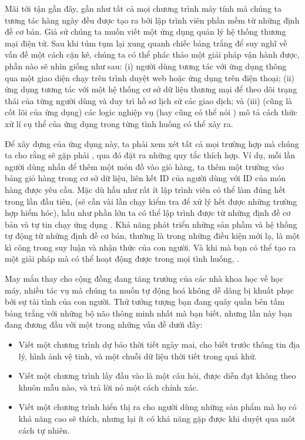 \documentclass[letterpaper,11pt,english]{sphinxmanual}
\begin{document}
Mãi tới tận gần đây, gần như tất cả mọi chương trình máy tính mà chúng
ta tương tác hàng ngày đều được tạo ra bởi lập trình viên phần mềm từ
những định đề cơ bản. Giả sử chúng ta muốn viết một ứng dụng quản lý hệ
thống thương mại điện tử. Sau khi túm tụm lại xung quanh chiếc bảng
trắng để suy nghĩ về vấn đề một cách cặn kẽ, chúng ta có thể phác thảo
một giải pháp vận hành được, phần nào sẽ nhìn giống như sau: (i) người
dùng tương tác với ứng dụng thông qua một giao diện chạy trên trình
duyệt web hoặc ứng dụng trên điện thoại; (ii) ứng dụng tương tác với một
hệ thống cơ sở dữ liệu thương mại để theo dõi trạng thái của từng người
dùng và duy trì hồ sơ lịch sử các giao dịch; và (iii) (cũng là cốt lõi
của ứng dụng) các logic nghiệp vụ (hay cũng có thể nói ) mô tả
cách thức xử lí cụ thể của ứng dụng trong từng tình huống có thể xảy ra.



Để xây dựng  của ứng dụng này, ta phải xem xét tất cả mọi trường
hợp mà chúng ta cho rằng sẽ gặp phải , qua đó đặt ra những quy tắc thích
hợp. Ví dụ, mỗi lần người dùng nhấn để thêm một món đồ vào giỏ hàng, ta
thêm một trường vào bảng giỏ hàng trong cơ sở dữ liệu, liên kết ID của
người dùng với ID của món hàng được yêu cầu. Mặc dù hầu như rất ít lập
trình viên có thể làm đúng hết trong lần đầu tiên, (sẽ cần vài lần chạy
kiểm tra để xử lý hết được những trường hợp hiểm hóc), hầu như phần lớn
ta có thể lập trình được từ những định đề cơ bản và tự tin chạy ứng dụng
. Khả năng phát
triển những sản phầm và hệ thống tự động từ những định đề cơ bản, thường
là trong những điều kiện mới lạ, là một kì công trong suy luận và nhận
thức của con người. Và khi mà bạn có thể tạo ra một giải pháp mà có thể
hoạt động được trong mọi tình huống, .



May mắn thay cho cộng đồng đang tăng trưởng của các nhà khoa học về học
máy, nhiều tác vụ mà chúng ta muốn tự động hoá không dễ dàng bị khuất
phục bởi sự tài tình của con người. Thử tưởng tượng bạn đang quây quần
bên tấm bảng trắng với những bộ não thông minh nhất mà bạn biết, nhưng
lần này bạn đang đương đầu với một trong những vấn đề dưới đây:


\begin{itemize}
\item {} 
Viết một chương trình dự báo thời tiết ngày mai, cho biết trước thông
tin địa lý, hình ảnh vệ tinh, và một chuỗi dữ liệu thời tiết trong
quá khứ.

\item {} 
Viết một chương trình lấy đầu vào là một câu hỏi, được diễn đạt không
theo khuôn mẫu nào, và trả lời nó một cách chính xác.

\item {} 
Viết một chương trình hiển thị ra cho người dùng những sản phẩm mà họ
có khả năng cao sẽ thích, nhưng lại ít có khả năng gặp được khi duyệt
qua môt cách tự nhiên.

\end{itemize}
\end{document}
